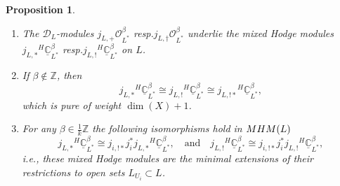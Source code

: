 \documentclass[11pt]{article}
\newcommand{\ie}{i.e.,\xspace}
\newcommand{\resp}{resp.\xspace}
\let\mathds\mathbb
\newcommand{\quand}{\quad\text{and}\quad}
\newtheorem{prop}[thm]{Proposition}
\newcommand{\dC}{{\mathds C}}\let\C\dC
\newcommand{\dZ}{{\mathds Z}}\let\mbz\dZ\let\Z\dZ
\newcommand{\cO}{\mathcal{O}}\let\O\cO
\newcommand{\MHM}{\textup{MHM}}
\begin{document}
\begin{prop}\label{prop:CBetaHodgeExt}
\begin{enumerate}
\item
The $\mathscr{D}_{L}$\nobreakdash-mod\-ules $j_{L,+} \cO^\beta_{L^{*}}$ \resp $j_{L,\dag} \cO^\beta_{L^{*}}$ underlie the mixed Hodge modules $j_{L,*} {^{H\!}}\underline{\dC}^\beta_{L^*}$
\resp $j_{L,!} {^{H\!}}\underline{\dC}^\beta_{L^*}$ on $L$.

\item
If
$\beta\notin\dZ$, then
\[
j_{L,*} {^{H\!}}\underline{\dC}^\beta_{L^*} \cong j_{L,!} {^{H\!}}\underline{\dC}^\beta_{L^*}\cong j_{L,!*} {^{H\!}}\underline{\dC}^\beta_{L^*},
\]
which is pure of weight $\dim(X)+1$.

\item
For any $\beta\in\frac{1}{k}\dZ$ the following isomorphisms hold in $\MHM(L)$
\[
j_{L,*} {^{H\!}}\underline{\dC}^\beta_{L^*} \cong
j_{i,!*} j_i^{*} j_{L,*} {^{H\!}}\underline{\dC}^\beta_{L^*},
\quand
j_{L,!} {^{H\!}}\underline{\dC}^\beta_{L^*}\cong
j_{i,!*} j_i^{*} j_{L,!} {^{H\!}}\underline{\dC}^\beta_{L^*},
\]
\ie these mixed Hodge modules are the minimal extensions of their restrictions to open sets $L_{U_i}\subset L$.
\end{enumerate}
\end{prop}
\end{document}
